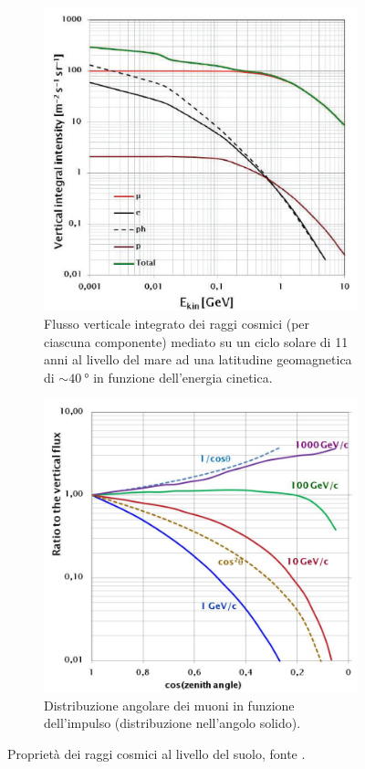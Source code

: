 \begin{figure}[H]
	\begin{subfigure}[t]{0.48\textwidth}
		\centering
		\includegraphics[width=\textwidth]{vertical_flux}
		\caption{\label{fig:vertical_flux}
		Flusso verticale integrato dei raggi cosmici (per ciascuna componente)
		mediato su un ciclo solare di 11 anni al livello del mare
		ad una latitudine geomagnetica di $\sim \SI{40}{\degree}$ in funzione dell'energia cinetica.}
	\end{subfigure}
	\hfill
	\begin{subfigure}[t]{0.48\textwidth}
		\centering
		\includegraphics[width=\textwidth]{angular_distribution}
		\caption{\label{fig:angular_distribution}
		Distribuzione angolare dei muoni in funzione dell'impulso
		(distribuzione nell'angolo solido).}
	\end{subfigure}
	\caption{\label{fig:vertical_angular}
	Proprietà dei raggi cosmici al livello del suolo, fonte \cite{1}.}
\end{figure}

